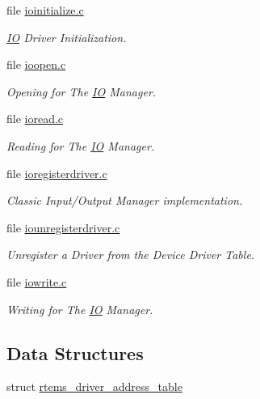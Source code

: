 \begin{DoxyCompactItemize}
file \mbox{\hyperlink{ioinitialize_8c}{ioinitialize.\+c}}
\begin{DoxyCompactList}\small\item\em \mbox{\hyperlink{structIO}{IO}} Driver Initialization. \end{DoxyCompactList}\item 
file \mbox{\hyperlink{ioopen_8c}{ioopen.\+c}}
\begin{DoxyCompactList}\small\item\em Opening for The \mbox{\hyperlink{structIO}{IO}} Manager. \end{DoxyCompactList}\item 
file \mbox{\hyperlink{ioread_8c}{ioread.\+c}}
\begin{DoxyCompactList}\small\item\em Reading for The \mbox{\hyperlink{structIO}{IO}} Manager. \end{DoxyCompactList}\item 
file \mbox{\hyperlink{ioregisterdriver_8c}{ioregisterdriver.\+c}}
\begin{DoxyCompactList}\small\item\em Classic Input/\+Output Manager implementation. \end{DoxyCompactList}\item 
file \mbox{\hyperlink{iounregisterdriver_8c}{iounregisterdriver.\+c}}
\begin{DoxyCompactList}\small\item\em Unregister a Driver from the Device Driver Table. \end{DoxyCompactList}\item 
file \mbox{\hyperlink{iowrite_8c}{iowrite.\+c}}
\begin{DoxyCompactList}\small\item\em Writing for The \mbox{\hyperlink{structIO}{IO}} Manager. \end{DoxyCompactList}\end{DoxyCompactItemize}
\subsection*{Data Structures}
\begin{DoxyCompactItemize}
\item 
struct \mbox{\hyperlink{structrtems__driver__address__table}{rtems\+\_\+driver\+\_\+address\+\_\+table}}
\end{DoxyCompactItemize}
